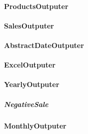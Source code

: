 		\paragraph{ProductsOutputer}
		\paragraph{SalesOutputer}
		\paragraph{AbstractDateOutputer}
		\paragraph{ExcelOutputer}
		\paragraph{YearlyOutputer}
	\subparagraph{NegativeSale}
		\paragraph{MonthlyOutputer}